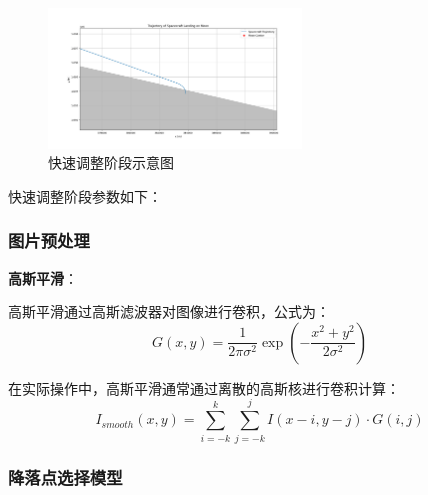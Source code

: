 \documentclass{ctexart}
\begin{document}
    \begin{figure}[H] %
        \centering %
        \includegraphics[width=0.6\textwidth]{"./picture/stage2.png"} %
        \caption{快速调整阶段示意图} %
        \label{fig:example} %
    \end{figure}
快速调整阶段参数如下：
\begin{center}
\end{center}

\subsubsection{图片预处理}
\textbf{高斯平滑}：

高斯平滑通过高斯滤波器对图像进行卷积，公式为：
\[
G(x, y) = \frac{1}{2\pi\sigma^2} \exp\left(-\frac{x^2 + y^2}{2\sigma^2}\right)
\]

在实际操作中，高斯平滑通常通过离散的高斯核进行卷积计算：
\[
I_{smooth}(x, y) = \sum_{i=-k}^{k} \sum_{j=-k}^{j} I(x-i, y-j) \cdot G(i, j)
\]
\subsubsection{降落点选择模型}
\end{document}

